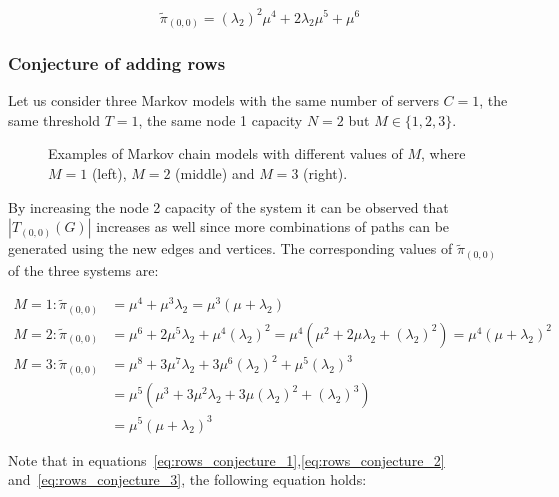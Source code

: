 \begin{equation*}
    \tilde{\pi}_{(0,0)} = (\lambda_2)^2 \mu^4 + 2 \lambda_2 \mu^5 + \mu^6
\end{equation*}

\subsubsection{Conjecture of adding rows}

Let us consider three Markov models with the same number of servers \(C=1\),
the same threshold \(T=1\), the same node 1 capacity \(N=2\) but
\(M\in\{1, 2, 3\}\).


\begin{figure}[H]
    \centering
    \scalebox{0.65}{
        }
    \scalebox{0.65}{
        }
    \scalebox{0.65}{
        }
    \caption{Examples of Markov chain models with different values of \(M\),
    where \(M=1\) (left), \(M=2\) (middle) and \(M=3\) (right).}
\end{figure}

By increasing the node 2 capacity of the system it can be observed that
\(|T_{(0,0)}(G)|\) increases as well since more combinations of paths can be
generated using the new edges and vertices.
The corresponding values of \(\tilde{\pi}_{(0,0)}\) of the three systems are:

\begin{align}
    M = 1: \tilde{\pi}_{(0,0)} &= \mu^4 + \mu^3 \lambda_2 =
    \mu^3 (\mu + \lambda_2) \label{eq:rows_conjecture_1}\\
    M = 2: \tilde{\pi}_{(0,0)} &= \mu^6 + 2\mu^5 \lambda_2 + \mu^4 (\lambda_2)^2
    = \mu^4(\mu^2 + 2\mu \lambda_2 + (\lambda_2)^2)
    = \mu^4 (\mu + \lambda_2) ^ 2 \label{eq:rows_conjecture_2}\\
    M = 3: \tilde{\pi}_{(0,0)} &= \mu^8 + 3 \mu^7 \lambda_2 +
    3 \mu^6 (\lambda_2)^2 + \mu^5(\lambda_2)^3 \nonumber \\
    &= \mu^5 (\mu^3 + 3 \mu ^2 \lambda_2 + 3 \mu (\lambda_2)^2 + (\lambda_2)^3)
    \nonumber \\
    &= \mu^5 (\mu + \lambda_2) ^ 3 \label{eq:rows_conjecture_3}
\end{align}

Note that in equations~\eqref{eq:rows_conjecture_1},\eqref{eq:rows_conjecture_2}
and~\eqref{eq:rows_conjecture_3}, the following equation holds:

